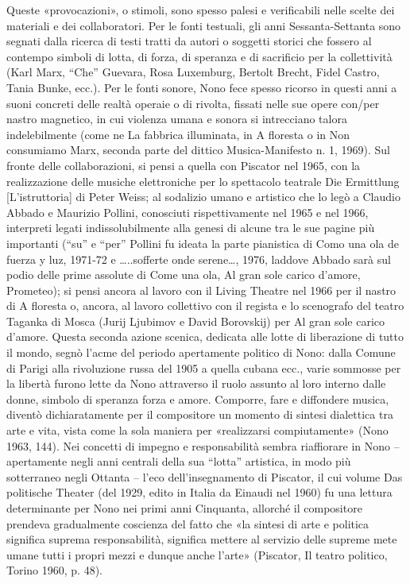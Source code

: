 Queste «provocazioni», o stimoli, sono spesso palesi e verificabili nelle scelte dei materiali e dei collaboratori. Per le fonti testuali, gli anni Sessanta-Settanta sono segnati dalla ricerca di testi tratti da autori o soggetti storici che fossero al contempo simboli di lotta, di forza, di speranza e di sacrificio per la collettività (Karl Marx, “Che” Guevara, Rosa Luxemburg, Bertolt Brecht, Fidel Castro, Tania Bunke, ecc.). Per le fonti sonore, Nono fece spesso ricorso in questi anni a suoni concreti delle realtà operaie o di rivolta, fissati nelle sue opere con/per nastro magnetico, in cui violenza umana e sonora si intrecciano talora indelebilmente (come ne La fabbrica illuminata, in A floresta o in Non consumiamo Marx, seconda parte del dittico Musica-Manifesto n. 1, 1969). Sul fronte delle collaborazioni, si pensi a quella con Piscator nel 1965, con la realizzazione delle musiche elettroniche per lo spettacolo teatrale Die Ermittlung [L’istruttoria] di Peter Weiss; al sodalizio umano e artistico che lo legò a Claudio Abbado e Maurizio Pollini, conosciuti rispettivamente nel 1965 e nel 1966, interpreti legati indissolubilmente alla genesi di alcune tra le sue pagine più importanti (“su” e “per” Pollini fu ideata la parte pianistica di Como una ola de fuerza y luz, 1971-72 e …..sofferte onde serene…, 1976, laddove Abbado sarà sul podio delle prime assolute di Come una ola, Al gran sole carico d’amore, Prometeo); si pensi ancora al lavoro con il Living Theatre nel 1966 per il nastro di A floresta o, ancora, al lavoro collettivo con il regista e lo scenografo del teatro Taganka di Mosca (Jurij Ljubimov e David Borovskij) per Al gran sole carico d’amore. Questa seconda azione scenica, dedicata alle lotte di liberazione di tutto il mondo, segnò l’acme del periodo apertamente politico di Nono: dalla Comune di Parigi alla rivoluzione russa del 1905 a quella cubana ecc., varie sommosse per la libertà furono lette da Nono attraverso il ruolo assunto al loro interno dalle donne, simbolo di speranza forza e amore. Comporre, fare e diffondere musica, diventò dichiaratamente per il compositore un momento di sintesi dialettica tra arte e vita, vista come la sola maniera per «realizzarsi compiutamente» (Nono 1963, 144). Nei concetti di impegno e responsabilità sembra riaffiorare in Nono – apertamente negli anni centrali della sua “lotta” artistica, in modo più sotterraneo negli Ottanta – l’eco dell’insegnamento di Piscator, il cui volume Das politische Theater (del 1929, edito in Italia da Einaudi nel 1960) fu una lettura determinante per Nono nei primi anni Cinquanta, allorché il compositore prendeva gradualmente coscienza del fatto che «la sintesi di arte e politica significa suprema responsabilità, significa mettere al servizio delle supreme mete umane tutti i propri mezzi e dunque anche l’arte» (Piscator, Il teatro politico, Torino 1960, p. 48).

